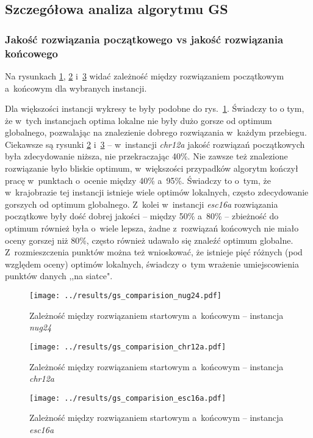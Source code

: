 \documentclass{article}
\begin{document}
	\subsection{Szczegółowa analiza algorytmu GS}

		\subsubsection{Jakość rozwiązania początkowego vs jakość rozwiązania końcowego}
			Na rysunkach \ref{fig:gs.nug24}, \ref{fig:gs.chr12a} i~\ref{fig:gs.esc16a} widać zależność między rozwiązaniem początkowym a~końcowym dla wybranych instancji.
			
			Dla większości instancji wykresy te były podobne do rys.~\ref{fig:gs.nug24}. Świadczy to o tym, że w~tych instancjach optima lokalne nie były dużo gorsze od optimum globalnego, pozwalając na znalezienie dobrego rozwiązania w~każdym przebiegu. Ciekawsze są rysunki \ref{fig:gs.chr12a} i~\ref{fig:gs.esc16a} -- w~instancji \emph{chr12a} jakość rozwiązań początkowych była zdecydowanie niższa, nie przekraczając 40\%. Nie zawsze też znalezione rozwiązanie było bliskie optimum, w~większości przypadków algorytm kończył pracę w~punktach o~ocenie między 40\% a~95\%. Świadczy to o~tym, że w~krajobrazie tej instancji istnieje wiele optimów lokalnych, często zdecydowanie gorszych od optimum globalnego. Z~kolei w~instancji \emph{esc16a} rozwiązania początkowe były dość dobrej jakości -- między 50\% a~80\% -- zbieżność do optimum również była o~wiele lepsza, żadne z~rozwiązań końcowych nie miało oceny gorszej niż 80\%, często również udawało się znaleźć optimum globalne. Z~rozmieszczenia punktów można też wnioskować, że istnieje pięć różnych (pod względem oceny) optimów lokalnych, świadczy o~tym wrażenie umiejscowienia punktów danych ,,na siatce".
			
			\begin{figure}[h]
				\texttt{[image: ../results/gs\_comparision\_nug24.pdf]}
				\caption{Zależność między rozwiązaniem startowym a~końcowym -- instancja \emph{nug24}\label{fig:gs.nug24}}				
			\end{figure}
			
			\begin{figure}[h]
				\texttt{[image: ../results/gs\_comparision\_chr12a.pdf]}
				\caption{Zależność między rozwiązaniem startowym a~końcowym -- instancja \emph{chr12a}\label{fig:gs.chr12a}}				
			\end{figure}
			
			\begin{figure}[h]
				\texttt{[image: ../results/gs\_comparision\_esc16a.pdf]}
				\caption{Zależność między rozwiązaniem startowym a~końcowym -- instancja \emph{esc16a}\label{fig:gs.esc16a}}				
			\end{figure}
		
\end{document}
